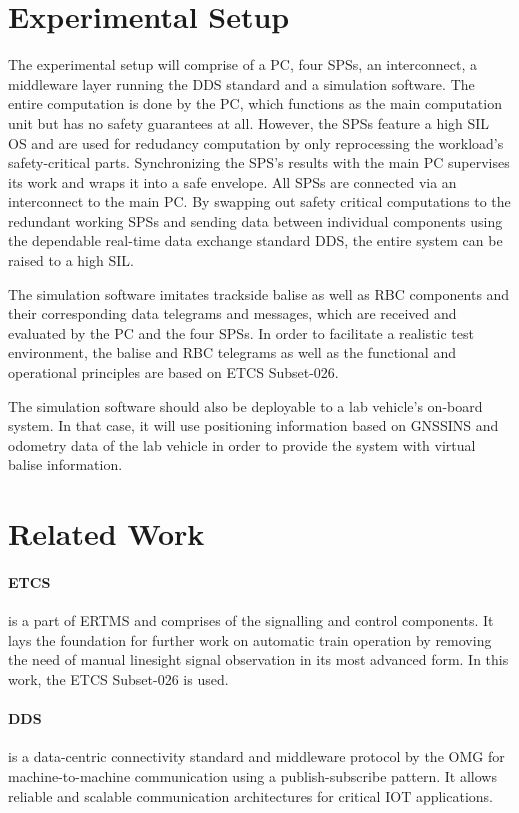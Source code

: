 \documentclass[a4paper, 12pt]{scrartcl}
\begin{document}
\section*{Experimental Setup}
The experimental setup will comprise of a PC, four \acp{SPS}, an interconnect, a middleware layer running the \ac{DDS} standard and a simulation software.
The entire computation is done by the PC, which functions as the main computation unit but has no safety guarantees at all.
However, the \acp{SPS} feature a high \ac{SIL} \ac{OS} and are used for redudancy computation by only reprocessing the workload's safety-critical parts.
Synchronizing the \ac{SPS}'s results with the main PC supervises its work and wraps it into a safe envelope.
All \acp{SPS} are connected via an interconnect to the main PC.
By swapping out safety critical computations to the redundant working \acp{SPS} and sending data between individual components using the dependable real-time data exchange standard \ac{DDS}, the entire system can be raised to a high \ac{SIL}.

The simulation software imitates trackside balise as well as \ac{RBC} components and their corresponding data telegrams and messages, which are received and evaluated by the PC and the four \acp{SPS}.
In order to facilitate a realistic test environment, the balise and \ac{RBC} telegrams as well as the functional and operational principles are based on \ac{ETCS} Subset-026.

The simulation software should also be deployable to a lab vehicle's on-board system.
In that case, it will use positioning information based on \ac{GNSSINS} and odometry data of the lab vehicle in order to provide the system with virtual balise information.

\section*{Related Work}
\paragraph{\ac{ETCS}} is a part of \ac{ERTMS} and comprises of the signalling and control components.
It lays the foundation for further work on automatic train operation by removing the need of manual linesight signal observation in its most advanced form.
In this work, the \ac{ETCS} Subset-026 is used.
\vspace{-0.4cm}
\paragraph{\ac{DDS}} is a data-centric connectivity standard and middleware protocol by the \ac{OMG} for machine-to-machine communication using a publish-subscribe pattern.
It allows reliable and scalable communication architectures for critical \ac{IOT} applications.
\vspace{-0.4cm}
\end{document}
